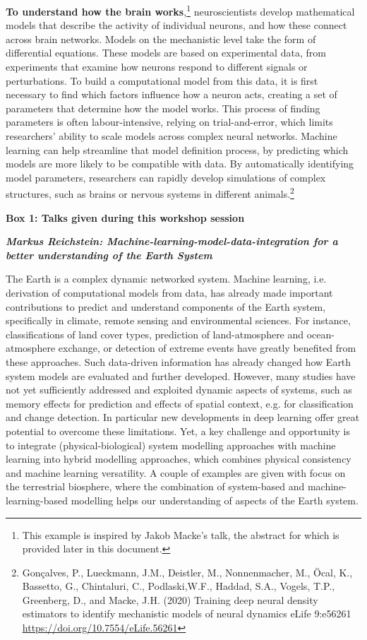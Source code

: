 \textbf{To understand how the brain works},\footnote{This example is
  inspired by Jakob Macke's talk, the abstract for which is provided
  later in this document.} neuroscientists develop mathematical models
that describe the activity of individual neurons, and how these connect
across brain networks. Models on the mechanistic level take the form of
differential equations. These models are based on experimental data,
from experiments that examine how neurons respond to different signals
or perturbations. To build a computational model from this data, it is
first necessary to find which factors influence how a neuron acts,
creating a set of parameters that determine how the model works. This
process of finding parameters is often labour-intensive, relying on
trial-and-error, which limits researchers' ability to scale models
across complex neural networks. Machine learning can help streamline
that model definition process, by predicting which models are more
likely to be compatible with data. By automatically identifying model
parameters, researchers can rapidly develop simulations of complex
structures, such as brains or nervous systems in different
animals.\footnote{Gonçalves, P., Lueckmann, J.M., Deistler, M.,
  Nonnenmacher, M., Öcal, K., Bassetto, G., Chintaluri, C.,
  Podlaski,W.F., Haddad, S.A., Vogels, T.P., Greenberg, D., and Macke,
  J.H. (2020) Training deep neural density estimators to identify
  mechanistic models of neural dynamics eLife 9:e56261
  \href{https://doi.org/10.7554/eLife.56261}{\uline{https://doi.org/10.7554/eLife.56261}}}

\textbf{Box 1: Talks given during this workshop session}

\emph{\textbf{Markus Reichstein: Machine-learning-model-data-integration
for a better understanding of the Earth System}}

The Earth is a complex dynamic networked system. Machine learning, i.e.
derivation of computational models from data, has already made important
contributions to predict and understand components of the Earth system,
specifically in climate, remote sensing and environmental sciences. For
instance, classifications of land cover types, prediction of
land-atmosphere and ocean-atmosphere exchange, or detection of extreme
events have greatly benefited from these approaches. Such data-driven
information has already changed how Earth system models are evaluated
and further developed. However, many studies have not yet sufficiently
addressed and exploited dynamic aspects of systems, such as memory
effects for prediction and effects of spatial context, e.g. for
classification and change detection. In particular new developments in
deep learning offer great potential to overcome these limitations. Yet,
a key challenge and opportunity is to integrate (physical-biological)
system modelling approaches with machine learning into hybrid modelling
approaches, which combines physical consistency and machine learning
versatility. A couple of examples are given with focus on the
terrestrial biosphere, where the combination of system-based and
machine-learning-based modelling helps our understanding of aspects of
the Earth system.


